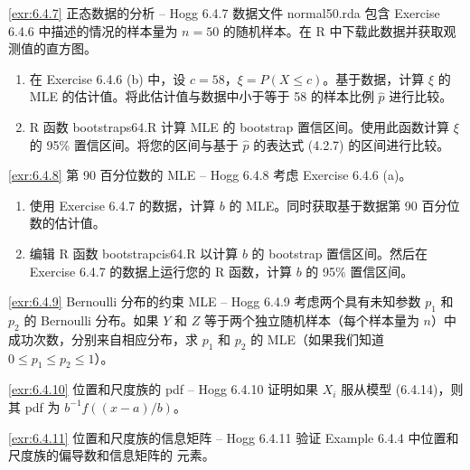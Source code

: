 \begin{exercise}{\ref{exr:6.4.7} 正态数据的分析 – Hogg 6.4.7}\label{exr:6.4.7}
数据文件 normal50.rda 包含 Exercise 6.4.6 中描述的情况的样本量为 $n=50$ 的随机样本。在 R 中下载此数据并获取观测值的直方图。

\begin{enumerate}
\item[(a)] 在 Exercise 6.4.6 (b) 中，设 $c=58$，$\xi = P(X \leq c)$。基于数据，计算 $\xi$ 的 MLE 的估计值。将此估计值与数据中小于等于 58 的样本比例 $\hat{p}$ 进行比较。
\item[(b)] R 函数 bootstraps64.R 计算 MLE 的 bootstrap 置信区间。使用此函数计算 $\xi$ 的 95\% 置信区间。将您的区间与基于 $\hat{p}$ 的表达式 (4.2.7) 的区间进行比较。
\end{enumerate}
\end{exercise}

\begin{exercise}{\ref{exr:6.4.8} 第 90 百分位数的 MLE – Hogg 6.4.8}\label{exr:6.4.8}
考虑 Exercise 6.4.6 (a)。

\begin{enumerate}
\item[(a)] 使用 Exercise 6.4.7 的数据，计算 $b$ 的 MLE。同时获取基于数据第 90 百分位数的估计值。
\item[(b)] 编辑 R 函数 bootstrapcis64.R 以计算 $b$ 的 bootstrap 置信区间。然后在 Exercise 6.4.7 的数据上运行您的 R 函数，计算 $b$ 的 95\% 置信区间。
\end{enumerate}
\end{exercise}

\begin{exercise}{\ref{exr:6.4.9} Bernoulli 分布的约束 MLE – Hogg 6.4.9}\label{exr:6.4.9}
考虑两个具有未知参数 $p_1$ 和 $p_2$ 的 Bernoulli 分布。如果 $Y$ 和 $Z$ 等于两个独立随机样本（每个样本量为 $n$）中成功次数，分别来自相应分布，求 $p_1$ 和 $p_2$ 的 MLE（如果我们知道 $0 \leq p_1 \leq p_2 \leq 1$）。
\end{exercise}

\begin{exercise}{\ref{exr:6.4.10} 位置和尺度族的 pdf – Hogg 6.4.10}\label{exr:6.4.10}
证明如果 $X_i$ 服从模型 (6.4.14)，则其 pdf 为 $b^{-1}f((x-a)/b)$。
\end{exercise}

\begin{exercise}{\ref{exr:6.4.11} 位置和尺度族的信息矩阵 – Hogg 6.4.11}\label{exr:6.4.11}
验证 Example 6.4.4 中位置和尺度族的偏导数和信息矩阵的 元素。
\end{exercise}

